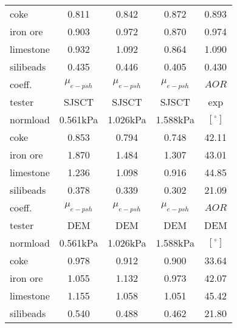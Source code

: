 \begin{table}[!htb]
\begin{tabular}{|lcccc|}
	\hline
	    coke  & 0.811 & 0.842 & 0.872 & 0.893 \\
    iron ore & 0.903 & 0.972 & 0.870 & 0.974 \\
    limestone & 0.932 & 1.092 & 0.864 & 1.090 \\
    silibeads & 0.435 & 0.446 & 0.405 & 0.430 \\
	\hline
	\hline
    coeff. & $\mu_{e-psh}$ & $\mu_{e-psh}$ & $\mu_{e-psh}$ & $AOR$ \\
    tester & SJSCT & SJSCT & SJSCT &  exp\\
    normload & 0.561kPa & 1.026kPa & 1.588kPa & $[^{\circ}]$ \\
	\hline
    coke  & 0.853 & 0.794 & 0.748 & 42.11 \\
    iron ore & 1.870 & 1.484 & 1.307 & 43.01 \\
    limestone & 1.236  & 1.098  & 0.916  & 44.85 \\
    silibeads & 0.378  & 0.339  & 0.302  & 21.09 \\
	\hline
	\hline
    coeff. & $\mu_{e-psh}$ & $\mu_{e-psh}$ & $\mu_{e-psh}$ & $AOR$ \\
    tester & DEM   & DEM   & DEM   & DEM \\
    normload & 0.561kPa & 1.026kPa & 1.588kPa & $[^{\circ}]$ \\
	\hline
    coke  & 0.978 & 0.912 & 0.900 & 33.64 \\
    iron ore & 1.055 & 1.132 & 0.973 & 42.07 \\
    limestone & 1.155 & 1.058 & 1.051 & 45.42 \\
    silibeads & 0.540 & 0.488 & 0.462 & 21.80 \\
	\hline
    \end{tabular}%
  \label{tab:comparisontable}%
\end{table}%
